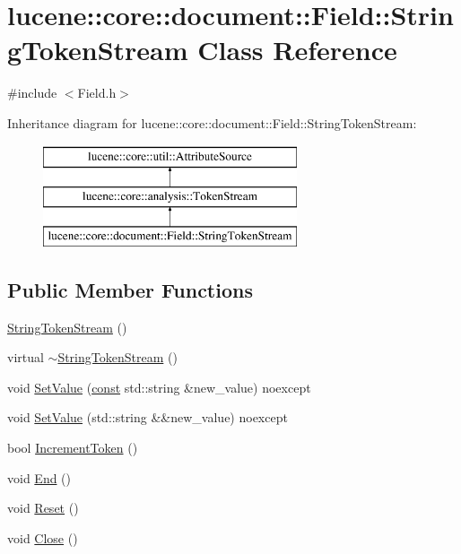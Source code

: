 \hypertarget{classlucene_1_1core_1_1document_1_1Field_1_1StringTokenStream}{}\section{lucene\+:\+:core\+:\+:document\+:\+:Field\+:\+:String\+Token\+Stream Class Reference}
\label{classlucene_1_1core_1_1document_1_1Field_1_1StringTokenStream}


{\ttfamily \#include $<$Field.\+h$>$}

Inheritance diagram for lucene\+:\+:core\+:\+:document\+:\+:Field\+:\+:String\+Token\+Stream\+:\begin{figure}[H]
\begin{center}
\leavevmode
\includegraphics[height=3.000000cm]{classlucene_1_1core_1_1document_1_1Field_1_1StringTokenStream}
\end{center}
\end{figure}
\subsection*{Public Member Functions}
\begin{DoxyCompactItemize}
\item 
\mbox{\hyperlink{classlucene_1_1core_1_1document_1_1Field_1_1StringTokenStream_afccecc9c42efd7a2f877f1603dc6fe24}{String\+Token\+Stream}} ()
\item 
virtual \mbox{\hyperlink{classlucene_1_1core_1_1document_1_1Field_1_1StringTokenStream_a6331ec9abcbb378340d8d3b529984877}{$\sim$\+String\+Token\+Stream}} ()
\item 
void \mbox{\hyperlink{classlucene_1_1core_1_1document_1_1Field_1_1StringTokenStream_a6ae21119a25849cde57ccab961acc6b6}{Set\+Value}} (\mbox{\hyperlink{ZlibCrc32_8h_a2c212835823e3c54a8ab6d95c652660e}{const}} std\+::string \&new\+\_\+value) noexcept
\item 
void \mbox{\hyperlink{classlucene_1_1core_1_1document_1_1Field_1_1StringTokenStream_a1c8b8ddfdbe6ae7ceaa55f6a40598304}{Set\+Value}} (std\+::string \&\&new\+\_\+value) noexcept
\item 
bool \mbox{\hyperlink{classlucene_1_1core_1_1document_1_1Field_1_1StringTokenStream_a161893ca5de24e392426fea5999334fb}{Increment\+Token}} ()
\item 
void \mbox{\hyperlink{classlucene_1_1core_1_1document_1_1Field_1_1StringTokenStream_acbadfa77de855b030af35f1206231525}{End}} ()
\item 
void \mbox{\hyperlink{classlucene_1_1core_1_1document_1_1Field_1_1StringTokenStream_a36e021820bb6ed2984c4f34f2f41a470}{Reset}} ()
\item 
void \mbox{\hyperlink{classlucene_1_1core_1_1document_1_1Field_1_1StringTokenStream_a1852abe05943aaf330ef776fc783f472}{Close}} ()
\end{DoxyCompactItemize}
